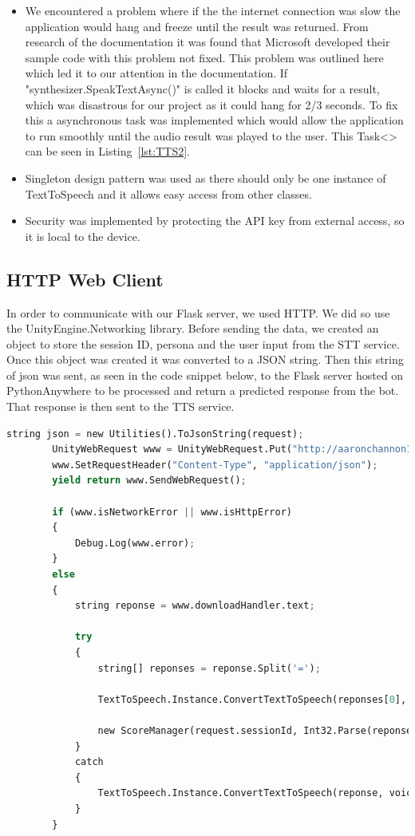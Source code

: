 \begin{itemize}
  \item We encountered a problem where if the the internet connection was slow the application would hang and freeze until the result was returned. From research of the documentation it was found that Microsoft developed their sample code with this problem not fixed. This problem was outlined here \cite{stackoverflow} which led it to our attention in the documentation. If "synthesizer.SpeakTextAsync()" is called it blocks and waits for a result, which was disastrous for our project as it could hang for 2/3 seconds. To fix this a asynchronous task was implemented which would allow the application to run smoothly until the audio result was played to the user. This Task<> can be seen in Listing~\ref{lst:TTS2}.
  \item Singleton design pattern was used as there should only be one instance of TextToSpeech and it allows easy access from other classes.
  \item Security was implemented by protecting the API key from external access, so it is local to the device.
\end{itemize}

\subsection{HTTP Web Client}
In order to communicate with our Flask server, we used HTTP. We did so use the UnityEngine.Networking library. Before sending the data, we created an object to store the session ID, persona and the user input from the STT service. Once this object was created it was converted to a JSON string. Then this string of json was sent, as seen in the code snippet below, to the Flask server hosted on PythonAnywhere to be processed and return a predicted response from the bot. That response is then sent to the TTS service.

\begin{lstlisting}[language=python]
        string json = new Utilities().ToJsonString(request);
        UnityWebRequest www = UnityWebRequest.Put("http://aaronchannon1.pythonanywhere.com/request", json);
        www.SetRequestHeader("Content-Type", "application/json");
        yield return www.SendWebRequest();

        if (www.isNetworkError || www.isHttpError)
        {
            Debug.Log(www.error);
        }
        else
        {
            string reponse = www.downloadHandler.text;

            try
            {
                string[] reponses = reponse.Split('=');

                TextToSpeech.Instance.ConvertTextToSpeech(reponses[0], voiceName, false);

                new ScoreManager(request.sessionId, Int32.Parse(reponses[1]), request.userInput, reponses[0]).UpdateScore();
            }
            catch
            { 
                TextToSpeech.Instance.ConvertTextToSpeech(reponse, voiceName, false);
            }
        }
\end{lstlisting}

